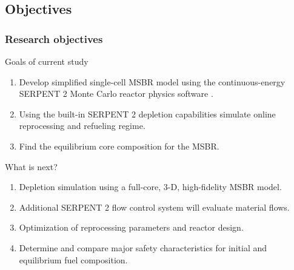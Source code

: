 \subsection{Objectives}
\begin{frame}
  \frametitle{Research objectives}
                  \vspace*{-0.1in}
              \begin{block}{Goals of current study}
               \begin{enumerate}
                \item Develop simplified single-cell \gls{MSBR} model using the continuous-energy SERPENT 2 Monte Carlo reactor
					physics software \cite{leppanen_serpent_2012}.
                \item Using the built-in SERPENT 2 depletion  capabilities simulate online reprocessing and refueling regime.
                \item Find the equilibrium core composition for the \gls{MSBR}.
               \end{enumerate}
               \end{block}
               
               \begin{block}{What is next?}
               \begin{enumerate}
                \item Depletion simulation using a full-core, 3-D, high-fidelity \gls{MSBR} model.
                \item Additional SERPENT 2 flow control system will evaluate material flows.
                \item Optimization of reprocessing parameters and reactor design.
                \item Determine and compare major safety characteristics for initial and equilibrium fuel composition.
               \end{enumerate}
               \end{block}

\end{frame}

